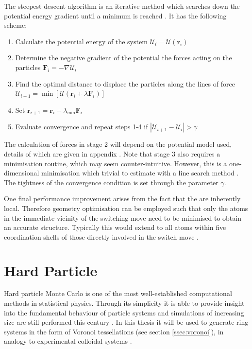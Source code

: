 The steepest descent algorithm is an iterative method which searches down the potential energy gradient until a minimum is reached \cite{Nocedal2006}.
It has the following scheme:
\begin{enumerate}
	\item Calculate the potential energy of the system $\mathcal{U}_i=\mathcal{U}\left(\mathbf{r}_i\right)$
	\item Determine the negative gradient of the potential \ie{} the forces acting on the particles $\mathbf{F}_i=-\nabla \mathcal{U}_i$ 
	\item Find the optimal distance to displace the particles along the lines of force $\mathcal{U}_{i+1}=\min \left[\mathcal{U}\left(\mathbf{r}_i+\lambda \mathbf{F}_i\right)\right]$
	\item Set $\mathbf{r}_{i+1}=\mathbf{r}_i+\lambda_{\text{min}} \mathbf{F}_i$
	\item Evaluate convergence and repeat steps 1-4 if $\left|\mathcal{U}_{i+1}-\mathcal{U}_i\right|>\gamma$
\end{enumerate}
The calculation of forces in stage 2 will depend on the potential model used, details of which are given in appendix .
Note that stage 3 also requires a minimisation routine, which may seem counter\--intuitive. 
However, this is a one\--dimensional minimisation which trivial to estimate with a line search method .
The tightness of the convergence condition is set through the parameter $\gamma$.

One final performance improvement arises from the fact that the \mc{} are inherently local.
Therefore geometry optimisation can be employed such that only the atoms in the immediate vicinity of the switching move need to be minimised to obtain an accurate structure.
Typically this would extend to all atoms within five coordination shells of those directly involved in the switch move \cite{Mousseau2001}.

\section{Hard Particle \mc}

Hard particle Monte Carlo is one of the most well\--established computational methods in statistical physics.
Through its simplicity it is able to provide insight into the fundamental behaviour of particle systems and simulations of increasing size are still performed this century \cite{Isobe2016,Bernard2009,Anderson2013,Isobe2015}.
In this thesis it will be used to generate ring systems in the form of Voronoi tessellations (see section \ref{ssec:voronoi}), in analogy to experimental colloidal systems \cite{Thorneywork2017}.

